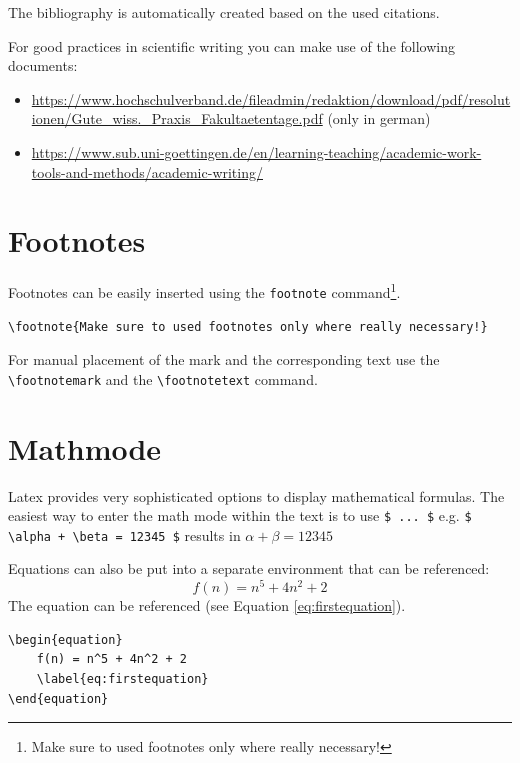 The bibliography is automatically created based on the used citations.

For good practices in scientific writing you can make use of the following documents: 

\begin{itemize}
\item \url{https://www.hochschulverband.de/fileadmin/redaktion/download/pdf/resolutionen/Gute_wiss._Praxis_Fakultaetentage.pdf} (only in german)
\item
\url{https://www.sub.uni-goettingen.de/en/learning-teaching/academic-work-tools-and-methods/academic-writing/}


\end{itemize}

\section{Footnotes}
Footnotes can be easily inserted using the \texttt{footnote} command\footnote{Make sure to used footnotes only where really necessary!}.
\begin{verbatim}
\footnote{Make sure to used footnotes only where really necessary!}
\end{verbatim}

For manual placement of the mark and the corresponding text use the \texttt{\textbackslash footnotemark} and the \texttt{\textbackslash footnotetext} command.


\section{Mathmode}
Latex provides very sophisticated options to display mathematical formulas. The easiest way to enter the math mode within the text is to use \texttt{\$ ... \$} e.g. \texttt{\$ \textbackslash alpha + \textbackslash beta = 12345 \$} results in $\alpha + \beta = 12345$

Equations can also be put into a separate environment that can be referenced:
\begin{equation}
    f(n) = n^5 + 4n^2 + 2
    \label{eq:firstequation}
\end{equation}
The equation can be referenced (see Equation \ref{eq:firstequation}).

\begin{verbatim}
\begin{equation}
    f(n) = n^5 + 4n^2 + 2
    \label{eq:firstequation}
\end{equation}
\end{verbatim}

